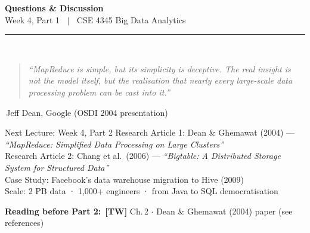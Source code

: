 \documentclass[aspectratio=169,10pt]{beamer}
\begin{document}
\begin{frame}[c]
  \begin{center}
    {\Large\bfseries Questions \& Discussion}\\[10pt]
    {\large Week 4, Part 1 $\;\mid\;$ CSE 4345 Big Data Analytics}\\[8pt]
    \textcolor{PUGray}{\rule{7cm}{0.5pt}}\\[10pt]
    \begin{quote}
      \itshape ``MapReduce is simple, but its simplicity is deceptive.  The real insight is not the model itself, but the realisation that nearly every large-scale data processing problem can be cast into it.''
    \end{quote}
    \hfill\textemdash\,Jeff Dean, Google (OSDI 2004 presentation)
    \vspace{12pt}
    \begin{block}{\centering Next Lecture: Week 4, Part 2}
      \centering
      Research Article 1: Dean \& Ghemawat (2004) — \textit{``MapReduce: Simplified Data Processing on Large Clusters''}\\[4pt]
      Research Article 2: Chang et al.\ (2006) — \textit{``Bigtable: A Distributed Storage System for Structured Data''}\\[4pt]
      \small Case Study: Facebook's data warehouse migration to Hive (2009) \\
      Scale: 2 PB data · 1{,}000+ engineers · from Java to SQL democratisation
    \end{block}
    \vspace{6pt}
    \textbf{Reading before Part 2:}\ \textbf{[TW]} Ch.\,2 $\cdot$ Dean \& Ghemawat (2004) paper (see references)
  \end{center}
\end{frame}

\end{document}

